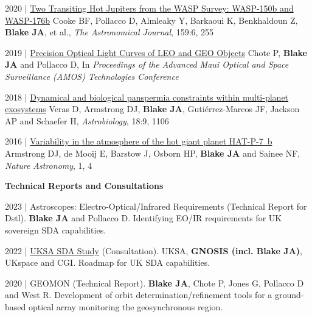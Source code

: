 \documentclass[10pt,a4paper]{altacv}
\begin{document}
\smallskip

\small
2020 | \href{https://iopscience.iop.org/article/10.3847/1538-3881/ab88db/meta}{Two Transiting Hot Jupiters from the WASP Survey: WASP-150b and WASP-176b}
Cooke BF, Pollacco D, Almleaky Y, Barkaoui K, Benkhaldoun Z, \textbf{Blake JA}, et al., \textit{The Astronomical Journal}, 159:6, 255

\smallskip 

\small
2019 | \href{https://www.researchgate.net/publication/338450520_Precision_Optical_Light_Curves_of_LEO_and_GEO_Objects}{Precision Optical Light Curves of LEO and GEO Objects}
Chote P, \linebreak\textbf{Blake JA} and Pollacco D, In \textit{Proceedings of the Advanced Maui Optical and Space Surveillance (AMOS) Technologies Conference}

\smallskip

\small
2018 | \href{https://www.liebertpub.com/doi/abs/10.1089/ast.2017.1786}{Dynamical and biological panspermia constraints within multi-planet exosystems}
Veras D, Armstrong DJ, \textbf{Blake JA}, Guti{\'e}rrez-Marcos JF, Jackson AP and Schaefer H, \textit{Astrobiology}, 18:9, 1106

\smallskip 

\small 
2016 | \href{https://www.nature.com/articles/s41550-016-0004}{Variability in the atmosphere of the hot giant planet HAT-P-7~b}
Armstrong DJ, de Mooij E, Barstow J, Osborn HP, \textbf{Blake JA} and Sainee NF, \textit{Nature Astronomy}, 1, 4 

\divider

\normalsize \textbf{Technical Reports and Consultations} 

\medskip

\small
2023 | Astroscopes: Electro-Optical/Infrared Requirements (Technical Report for Dstl).
\textbf{Blake JA} and Pollacco D. Identifying EO/IR requirements for UK sovereign SDA capabilities.

\smallskip 

\small 
2022 | \href{https://www.ukspace.org/new-space-domain-awareness-study-published/}{UKSA SDA Study} (Consultation).
UKSA, \textbf{GNOSIS (incl. Blake JA)}, UKspace and CGI. Roadmap for UK SDA capabilities.

\smallskip 

\small 
2020 | GEOMON (Technical Report).
\textbf{Blake JA}, Chote P, Jones G, Pollacco D and West R. Development of orbit determination/refinement tools for a ground-based optical array monitoring the geosynchronous region. 
\end{document}

